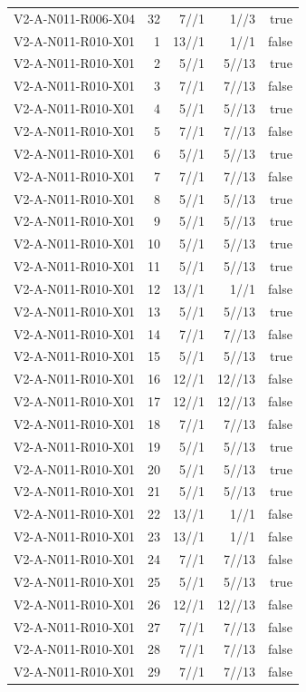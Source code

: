 {\begin{longtable}{lrrrr}
V2-A-N011-R006-X04 & 32 & 7//1 & 1//3 & true \\
V2-A-N011-R010-X01 & 1 & 13//1 & 1//1 & false \\
V2-A-N011-R010-X01 & 2 & 5//1 & 5//13 & true \\
V2-A-N011-R010-X01 & 3 & 7//1 & 7//13 & false \\
V2-A-N011-R010-X01 & 4 & 5//1 & 5//13 & true \\
V2-A-N011-R010-X01 & 5 & 7//1 & 7//13 & false \\
V2-A-N011-R010-X01 & 6 & 5//1 & 5//13 & true \\
V2-A-N011-R010-X01 & 7 & 7//1 & 7//13 & false \\
V2-A-N011-R010-X01 & 8 & 5//1 & 5//13 & true \\
V2-A-N011-R010-X01 & 9 & 5//1 & 5//13 & true \\
V2-A-N011-R010-X01 & 10 & 5//1 & 5//13 & true \\
V2-A-N011-R010-X01 & 11 & 5//1 & 5//13 & true \\
V2-A-N011-R010-X01 & 12 & 13//1 & 1//1 & false \\
V2-A-N011-R010-X01 & 13 & 5//1 & 5//13 & true \\
V2-A-N011-R010-X01 & 14 & 7//1 & 7//13 & false \\
V2-A-N011-R010-X01 & 15 & 5//1 & 5//13 & true \\
V2-A-N011-R010-X01 & 16 & 12//1 & 12//13 & false \\
V2-A-N011-R010-X01 & 17 & 12//1 & 12//13 & false \\
V2-A-N011-R010-X01 & 18 & 7//1 & 7//13 & false \\
V2-A-N011-R010-X01 & 19 & 5//1 & 5//13 & true \\
V2-A-N011-R010-X01 & 20 & 5//1 & 5//13 & true \\
V2-A-N011-R010-X01 & 21 & 5//1 & 5//13 & true \\
V2-A-N011-R010-X01 & 22 & 13//1 & 1//1 & false \\
V2-A-N011-R010-X01 & 23 & 13//1 & 1//1 & false \\
V2-A-N011-R010-X01 & 24 & 7//1 & 7//13 & false \\
V2-A-N011-R010-X01 & 25 & 5//1 & 5//13 & true \\
V2-A-N011-R010-X01 & 26 & 12//1 & 12//13 & false \\
V2-A-N011-R010-X01 & 27 & 7//1 & 7//13 & false \\
V2-A-N011-R010-X01 & 28 & 7//1 & 7//13 & false \\
V2-A-N011-R010-X01 & 29 & 7//1 & 7//13 & false \\

\end{longtable}}
